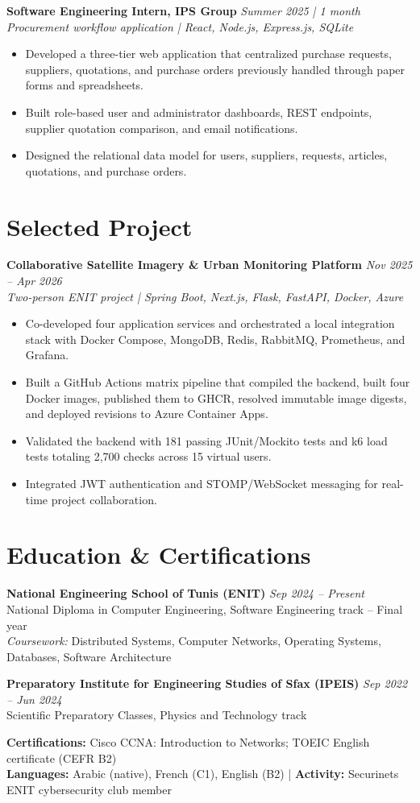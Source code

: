 \documentclass[10pt,a4paper]{article}
\begin{document}
\textbf{Software Engineering Intern, IPS Group} \hfill \textit{Summer 2025 | 1 month}\\
\textit{Procurement workflow application | React, Node.js, Express.js, SQLite}
\begin{itemize}
  \item Developed a three-tier web application that centralized purchase requests, suppliers, quotations, and purchase orders previously handled through paper forms and spreadsheets.
  \item Built role-based user and administrator dashboards, REST endpoints, supplier quotation comparison, and email notifications.
  \item Designed the relational data model for users, suppliers, requests, articles, quotations, and purchase orders.
\end{itemize}

\section{Selected Project}
\textbf{Collaborative Satellite Imagery \& Urban Monitoring Platform} \hfill \textit{Nov 2025 -- Apr 2026}\\
\textit{Two-person ENIT project | Spring Boot, Next.js, Flask, FastAPI, Docker, Azure}
\begin{itemize}
  \item Co-developed four application services and orchestrated a local integration stack with Docker Compose, MongoDB, Redis, RabbitMQ, Prometheus, and Grafana.
  \item Built a GitHub Actions matrix pipeline that compiled the backend, built four Docker images, published them to GHCR, resolved immutable image digests, and deployed revisions to Azure Container Apps.
  \item Validated the backend with 181 passing JUnit/Mockito tests and k6 load tests totaling 2,700 checks across 15 virtual users.
  \item Integrated JWT authentication and STOMP/WebSocket messaging for real-time project collaboration.
\end{itemize}

\section{Education \& Certifications}
\textbf{National Engineering School of Tunis (ENIT)} \hfill \textit{Sep 2024 -- Present}\\
National Diploma in Computer Engineering, Software Engineering track -- Final year\\
\textit{Coursework:} Distributed Systems, Computer Networks, Operating Systems, Databases, Software Architecture

\textbf{Preparatory Institute for Engineering Studies of Sfax (IPEIS)} \hfill \textit{Sep 2022 -- Jun 2024}\\
Scientific Preparatory Classes, Physics and Technology track

\textbf{Certifications:} Cisco CCNA: Introduction to Networks; TOEIC English certificate (CEFR B2)\\
\textbf{Languages:} Arabic (native), French (C1), English (B2) \enspace|\enspace
\textbf{Activity:} Securinets ENIT cybersecurity club member
\end{document}
